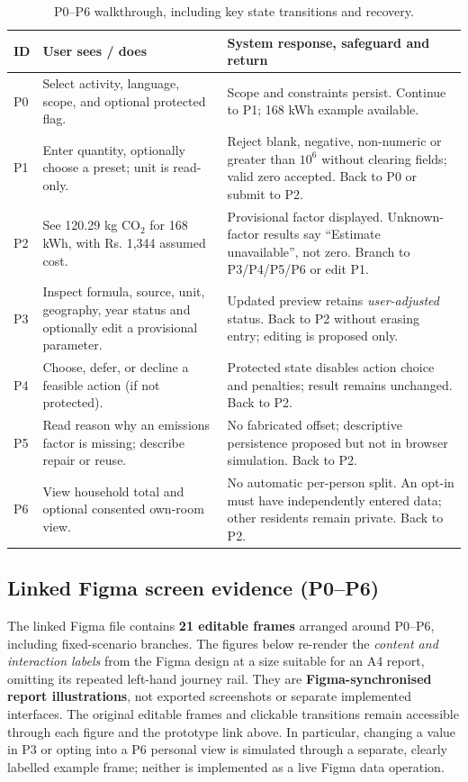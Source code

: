 \documentclass[12pt,a4paper]{article}
\begin{document}
\begin{table}[H]
\centering\footnotesize
\caption{P0--P6 walkthrough, including key state transitions and recovery.}
\label{tab:walkthrough}
\begin{tabularx}{\textwidth}{@{}p{0.8cm}p{4.1cm}X@{}}
\toprule
\textbf{ID}&\textbf{User sees / does}&\textbf{System response, safeguard and return}\\
\midrule
P0&Select activity, language, scope, and optional protected flag.&Scope and constraints persist. Continue to P1; 168 kWh example available.\\
P1&Enter quantity, optionally choose a preset; unit is read-only.&Reject blank, negative, non-numeric or greater than $10^6$ without clearing fields; valid zero accepted. Back to P0 or submit to P2.\\
P2&See 120.29 kg CO$_2$ for 168 kWh, with Rs. 1,344 assumed cost.&Provisional factor displayed. Unknown-factor results say ``Estimate unavailable'', not zero. Branch to P3/P4/P5/P6 or edit P1.\\
P3&Inspect formula, source, unit, geography, year status and optionally edit a provisional parameter.&Updated preview retains \emph{user-adjusted} status. Back to P2 without erasing entry; editing is proposed only.\\
P4&Choose, defer, or decline a feasible action (if not protected).&Protected state disables action choice and penalties; result remains unchanged. Back to P2.\\
P5&Read reason why an emissions factor is missing; describe repair or reuse.&No fabricated offset; descriptive persistence proposed but not in browser simulation. Back to P2.\\
P6&View household total and optional consented own-room view.&No automatic per-person split. An opt-in must have independently entered data; other residents remain private. Back to P2.\\
\bottomrule
\end{tabularx}
\end{table}

\subsection{Linked Figma screen evidence (P0--P6)}
The linked Figma file contains \textbf{21 editable frames} arranged around P0--P6, including fixed-scenario branches. The figures below re-render the \emph{content and interaction labels} from the Figma design at a size suitable for an A4 report, omitting its repeated left-hand journey rail. They are \textbf{Figma-synchronised report illustrations}, not exported screenshots or separate implemented interfaces. The original editable frames and clickable transitions remain accessible through each figure and the prototype link above.
In particular, changing a value in P3 or opting into a P6 personal view is simulated through a separate, clearly labelled example frame; neither is implemented as a live Figma data operation.
\end{document}
